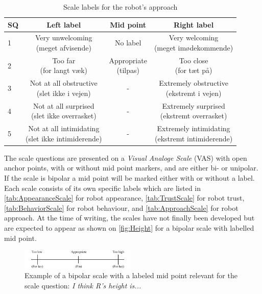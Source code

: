 \begin{table}[H]
	\centering
\caption{Scale labels for the robot's approach}
	\label{tab:ApproachScale} 
	\begin{tabular}{l|c|c|c}
		SQ     & Left label & Mid point & Right label \\\hline
		1   & \makecell{Very unwelcoming \\(meget afvisende)} & No label & \makecell{Very welcoming \\(meget imødekommende)}          \\\hline
		2   & \makecell{Too far \\(for langt væk)} & \makecell{Appropriate \\(tilpas)} & \makecell{Too close \\(for tæt på)}          \\\hline
		3   & \makecell{Not at all obstructive \\(slet ikke i vejen)}& -  & \makecell{Extremely obstructive \\(ekstremt i vejen)}  \\\hline
	 	4   & \makecell{Not at all surprised \\(slet ikke overrasket)} &  -  & \makecell{Extremely surprised \\(ekstremt overrasket)}       \\\hline
		5   & \makecell{Not at all intimidating \\(slet ikke intimiderende)} & - & \makecell{Extremely intimidating \\(ekstremt intimiderende)}           
	\end{tabular}
\end{table}
\noindent
%
The scale questions are presented on a \textit{Visual Analoge Scale} (VAS) with open anchor points, with or without mid point markers, and are either bi- or unipolar. If the scale is bipolar a mid point will be marked either with or without a label. Each scale consists of its own specific labels which are listed in \autoref{tab:AppearanceScale} for robot appearance, \autoref{tab:TrustScale} for robot trust,\autoref{tab:BehaviorScale} for robot behaviour, and \autoref{tab:ApproachScale} for robot approach. At the time of writing, the scales have not finally been developed but are expected to appear as shown on \autoref{fig:Height} for a bipolar scale with labelled mid point. 
%
\begin{figure}[H]
\centering
\includegraphics[width = 0.49\textwidth]{Figure/HeightHoejde} 
\caption{Example of a bipolar scale with a labeled mid point relevant for the scale question: \textit{I think R's height is...}}
\label{fig:Height}
\end{figure}
